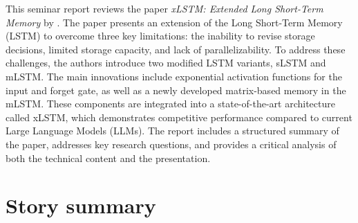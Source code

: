 \documentclass[a4paper,oneside,10pt,ngerman,english]{scrartcl}
\begin{document}



\cleardoubleoddpage


This seminar report reviews the paper \textit{xLSTM: Extended Long Short-Term Memory} \cite{beck2024xlstmextendedlongshortterm} by \citeauthor{beck2024xlstmextendedlongshortterm}. The paper presents an extension of the Long Short-Term Memory (LSTM) to overcome three key limitations: the inability to revise storage decisions, limited storage capacity, and lack of parallelizability. To address these challenges, the authors introduce two modified LSTM variants, sLSTM and mLSTM. The main innovations include exponential activation functions for the input and forget gate, as well as a newly developed matrix-based memory in the mLSTM. These components are integrated into a state-of-the-art architecture called xLSTM, which demonstrates competitive performance compared to current Large Language Models (LLMs). The report includes a structured summary of the paper, addresses key research questions, and provides a critical analysis of both the technical content and the presentation.




\cleardoubleoddpage

\section{Story summary}
\label{sec:storysummary}
\end{document}
